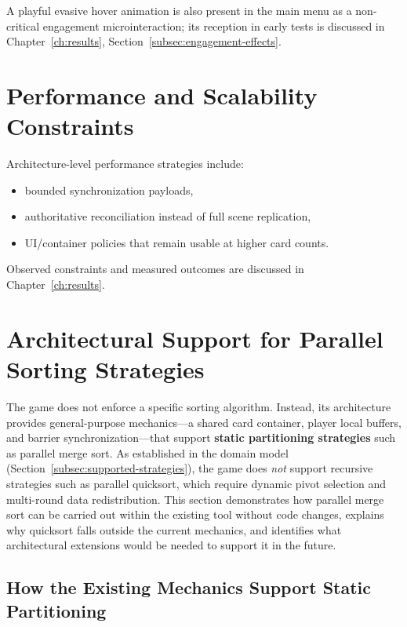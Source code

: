 A playful evasive hover animation is also present in the main menu as a non-critical engagement microinteraction; its reception in early tests is discussed in Chapter~\ref{ch:results}, Section~\ref{subsec:engagement-effects}.

\section{Performance and Scalability Constraints}
\label{sec:performance}

Architecture-level performance strategies include:
\begin{itemize}
    \item bounded synchronization payloads,
    \item authoritative reconciliation instead of full scene replication,
    \item UI/container policies that remain usable at higher card counts.
\end{itemize}

Observed constraints and measured outcomes are discussed in Chapter~\ref{ch:results}.

\section{Architectural Support for Parallel Sorting Strategies}
\label{sec:algorithm-mode-extensibility}

The game does not enforce a specific sorting algorithm. Instead, its architecture provides general-purpose mechanics---a shared card container, player local buffers, and barrier synchronization---that support \textbf{static partitioning strategies} such as parallel merge sort. As established in the domain model (Section~\ref{subsec:supported-strategies}), the game does \emph{not} support recursive strategies such as parallel quicksort, which require dynamic pivot selection and multi-round data redistribution. This section demonstrates how parallel merge sort can be carried out within the existing tool without code changes, explains why quicksort falls outside the current mechanics, and identifies what architectural extensions would be needed to support it in the future.

\subsection{How the Existing Mechanics Support Static Partitioning}
\label{subsec:algo-mode-arch-support}

